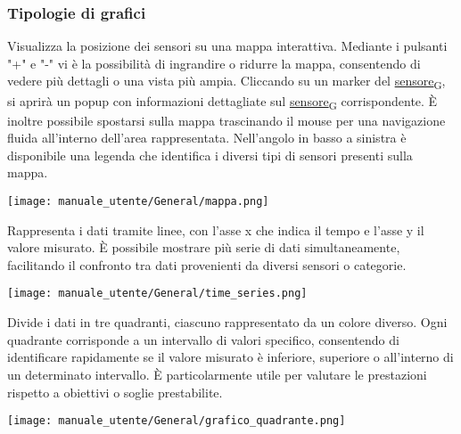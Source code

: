 \subsubsection{Tipologie di grafici}
Visualizza la posizione dei sensori su una mappa interattiva. Mediante i pulsanti "+" e "-" vi è la possibilità di ingrandire o ridurre la mappa, consentendo di vedere più dettagli o una vista più ampia. Cliccando su un marker del \href{https://7last.github.io/docs/pb/documentazione-interna/glossario\#sensore}{sensore\textsubscript{G}}, si aprirà un popup con informazioni dettagliate sul \href{https://7last.github.io/docs/pb/documentazione-interna/glossario\#sensore}{sensore\textsubscript{G}} corrispondente. È inoltre possibile spostarsi sulla mappa trascinando il mouse per una navigazione fluida all'interno dell'area rappresentata. Nell'angolo in basso a sinistra è disponibile una legenda che identifica i diversi tipi di sensori presenti sulla mappa.
\begin{center}
    \texttt{[image: manuale\_utente/General/mappa.png]}
\end{center}

Rappresenta i dati tramite linee, con l'asse x che indica il tempo e l'asse y il valore misurato. È possibile mostrare più serie di dati simultaneamente, facilitando il confronto tra dati provenienti da diversi sensori o categorie.
\begin{center}
    \texttt{[image: manuale\_utente/General/time\_series.png]}
\end{center} 
\newpage


Divide i dati in tre quadranti, ciascuno rappresentato da un colore diverso. Ogni quadrante corrisponde a un intervallo di valori specifico, consentendo di identificare rapidamente se il valore misurato è inferiore, superiore o all'interno di un determinato intervallo. È particolarmente utile per valutare le prestazioni rispetto a obiettivi o soglie prestabilite.
\begin{center}
    \texttt{[image: manuale\_utente/General/grafico\_quadrante.png]}
\end{center}

